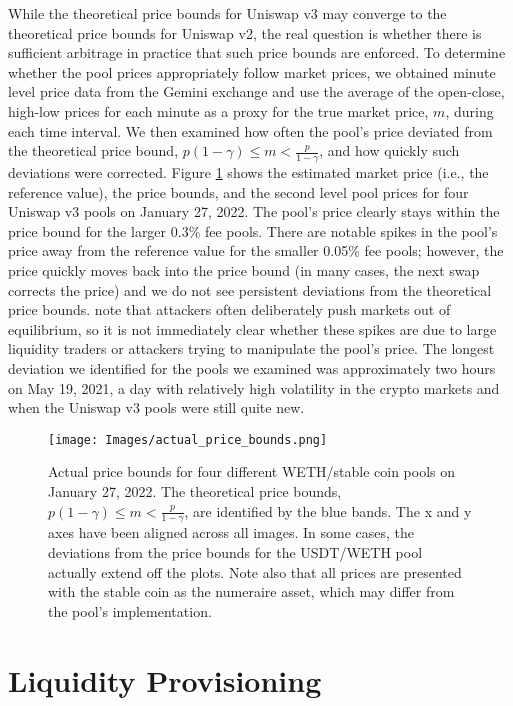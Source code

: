 \documentclass[11pt]{article}
\begin{document}
While the theoretical price bounds for Uniswap v3 may converge to the theoretical price bounds for Uniswap v2, the real question is whether there is sufficient arbitrage in practice that such price bounds are enforced. To determine whether the pool prices appropriately follow market prices, we obtained minute level price data from the Gemini exchange and use the average of the open-close, high-low prices for each minute as a proxy for the true market price, $m$, during each time interval. We then examined how often the pool's price deviated from the theoretical price bound, $p (1 - \gamma) \le m < \frac{p}{1 - \gamma}$, and how quickly such deviations were corrected. Figure \ref{fig:actual_price_bounds} shows the estimated market price (i.e., the reference value), the price bounds, and the second level pool prices for four Uniswap v3 pools on January 27, 2022. The pool's price clearly stays within the price bound for the larger 0.3\% fee pools. There are notable spikes in the pool's price away from the reference value for the smaller 0.05\% fee pools; however, the price quickly moves back into the price bound (in many cases, the next swap corrects the price) and we do not see persistent deviations from the theoretical price bounds. \citet{Lehar2021DecentralizedE} note that attackers often deliberately push markets out of equilibrium, so it is not immediately clear whether these spikes are due to large liquidity traders or attackers trying to manipulate the pool's price. The longest deviation we identified for the pools we examined was approximately two hours on May 19, 2021, a day with relatively high volatility in the crypto markets and when the Uniswap v3 pools were still quite new.

\begin{figure}[H]
    \centering
    \texttt{[image: Images/actual\_price\_bounds.png]}
    \caption{Actual price bounds for four different WETH/stable coin pools on January 27, 2022. The theoretical price bounds, $p (1 - \gamma) \le m < \frac{p}{1 - \gamma}$, are identified by the blue bands. The x and y axes have been aligned across all images. In some cases, the deviations from the price bounds for the USDT/WETH pool actually extend off the plots. Note also that all prices are presented with the stable coin as the numeraire asset, which may differ from the pool's implementation.}
    \label{fig:actual_price_bounds}
\end{figure}

\section{Liquidity Provisioning}\label{sec:4}
\end{document}
